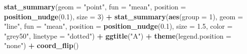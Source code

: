 \documentclass[
  french,
]{book}
\newenvironment{Shaded}{\begin{snugshade}}{\end{snugshade}}
\newcommand{\DataTypeTok}[1]{\textcolor[rgb]{0.13,0.29,0.53}{#1}}
\newcommand{\DecValTok}[1]{\textcolor[rgb]{0.00,0.00,0.81}{#1}}
\newcommand{\FloatTok}[1]{\textcolor[rgb]{0.00,0.00,0.81}{#1}}
\newcommand{\KeywordTok}[1]{\textcolor[rgb]{0.13,0.29,0.53}{\textbf{#1}}}
\newcommand{\NormalTok}[1]{#1}
\newcommand{\OperatorTok}[1]{\textcolor[rgb]{0.81,0.36,0.00}{\textbf{#1}}}
\newcommand{\StringTok}[1]{\textcolor[rgb]{0.31,0.60,0.02}{#1}}
\begin{document}
\begin{Shaded}
\begin{Highlighting}[]
\StringTok{  }\KeywordTok{stat_summary}\NormalTok{(}\DataTypeTok{geom =} \StringTok{"point"}\NormalTok{,}
               \DataTypeTok{fun =} \StringTok{"mean"}\NormalTok{, }
               \DataTypeTok{position =} \KeywordTok{position_nudge}\NormalTok{(}\FloatTok{0.1}\NormalTok{),}
               \DataTypeTok{size =} \DecValTok{3}\NormalTok{) }\OperatorTok{+}
\StringTok{  }\KeywordTok{stat_summary}\NormalTok{(}\KeywordTok{aes}\NormalTok{(}\DataTypeTok{group =} \DecValTok{1}\NormalTok{),}
               \DataTypeTok{geom =} \StringTok{"line"}\NormalTok{,}
               \DataTypeTok{fun =} \StringTok{"mean"}\NormalTok{, }
               \DataTypeTok{position =} \KeywordTok{position_nudge}\NormalTok{(}\FloatTok{0.1}\NormalTok{),}
               \DataTypeTok{size =} \FloatTok{1.5}\NormalTok{, }\DataTypeTok{color =} \StringTok{"grey50"}\NormalTok{,  }\DataTypeTok{linetype =} \StringTok{"dotted"}\NormalTok{) }\OperatorTok{+}
\StringTok{  }\KeywordTok{ggtitle}\NormalTok{(}\StringTok{"A"}\NormalTok{) }\OperatorTok{+}
\StringTok{  }\KeywordTok{theme}\NormalTok{(}\DataTypeTok{legend.position =} \StringTok{"none"}\NormalTok{) }\OperatorTok{+}
\StringTok{  }\KeywordTok{coord_flip}\NormalTok{()}



\end{Highlighting}
\end{Shaded}
\end{document}
